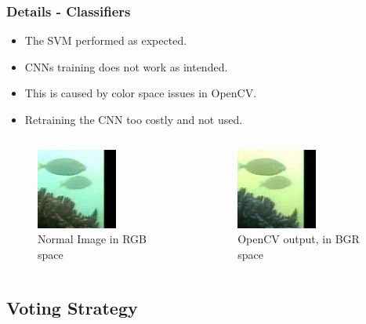 \documentclass{beamer}[fullspacing]
\begin{document}
\begin{frame}
\frametitle{Details - Classifiers}

\begin{itemize}
\item
The SVM performed as expected.
\item
CNNs training does not work as intended.
\item
This is caused by color space issues in OpenCV. 
\item
Retraining the CNN too costly and not used.
\end{itemize}

\begin{columns}
\setlength{\abovecaptionskip}{-2pt}
\begin{figure}
\includegraphics[scale=0.6]{image/outfile.jpg}
\caption{Normal Image in RGB space}
\end{figure}

\begin{figure}
\includegraphics[scale=0.6]{image/outfile2.jpg}
\caption{OpenCV output, in BGR space}
\end{figure}
\end{columns}

\end{frame}



\subsection{Voting Strategy}
\end{document}
